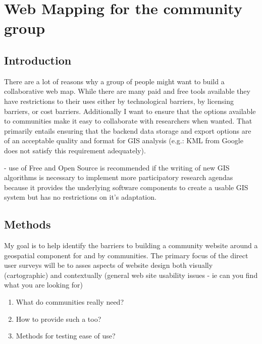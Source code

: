 \documentclass[12pt,letterpaper]{article}
\begin{document}
%

\section{Web Mapping for the community group}
\subsection{Introduction}
	There are a lot of reasons why a group of people might want to build a collaborative web map. While there are many paid and free tools available they have restrictions to their uses either by technological barriers, by licensing barriers, or cost barriers. Additionally I want to ensure that the options available to communities make it easy to collaborate with researchers when wanted. That primarily entails ensuring that the backend data storage and export options are of an acceptable quality and format for GIS analysis (e.g.: KML from Google does not satisfy this requirement adequately).
	
\parencite{Dunn2007} - use of Free and Open Source is recommended if the writing of new GIS algorithms is necessary to implement more participatory research agendas because it provides the underlying software components to create a usable GIS system but has no restrictions on it's adaptation.

\subsection{Methods}
My goal is to help identify the barriers to building a community website around a geospatial component for and by communities. The primary focus of the direct user surveys will be to asses aspects of website design both visually (cartographic) and contextually (general web site usability issues - ie can you find what you are looking for)
\begin{enumerate}
\item What do communities really need?
\item How to provide such a too?
\item Methods for testing ease of use?
\end{enumerate}
\end{document}
